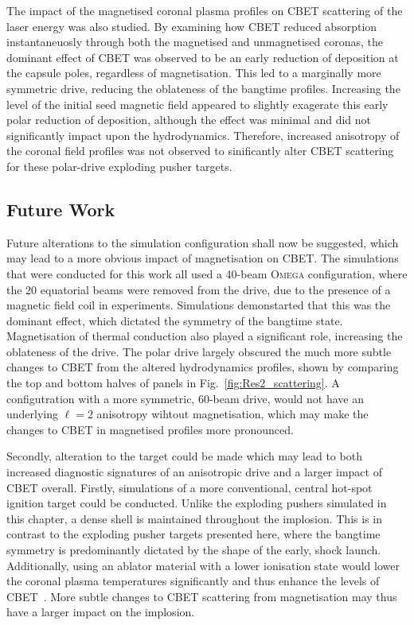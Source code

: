 The impact of the magnetised coronal plasma profiles on \ac{CBET} scattering of the laser energy was also studied.
By examining how \ac{CBET} reduced absorption instantaneuosly through both the magnetised and unmagnetised coronas, the dominant effect of \ac{CBET} was observed to be an early reduction of deposition at the capsule poles, regardless of magnetisation.
This led to a marginally more symmetric drive, reducing the oblateness of the bangtime profiles.
Increasing the level of the initial seed magnetic field appeared to slightly exagerate this early polar reduction of deposition, although the effect was minimal and did not significantly impact upon the hydrodynamics.
Therefore, increased anisotropy of the coronal field profiles was not observed to sinificantly alter \ac{CBET} scattering for these polar-drive exploding pusher targets.

\subsection{Future Work}%
\label{sec:Res2_future}

Future alterations to the simulation configuration shall now be suggested, which may lead to a more obvious impact of magnetisation on \ac{CBET}.
The simulations that were conducted for this work all used a 40-beam \textsc{Omega} configuration, where the 20 equatorial beams were removed from the drive, due to the presence of a magnetic field coil in experiments.
Simulations demonstarted that this was the dominant effect, which dictated the symmetry of the bangtime state.
Magnetisation of thermal conduction also played a significant role, increasing the oblateness of the drive.
The polar drive largely obscured the much more subtle changes to \ac{CBET} from the altered hydrodynamics profiles, shown by comparing the top and bottom halves of panels in Fig.~\ref{fig:Res2_scattering}.
A configutration with a more symmetric, 60-beam drive, would not have an underlying $\ell=2$ anisotropy wihtout magnetisation, which may make the changes to \ac{CBET} in magnetised profiles more pronounced.

Secondly, alteration to the target could be made which may lead to both increased diagnostic signatures of an anisotropic drive and a larger impact of \ac{CBET} overall.
Firstly, simulations of a more conventional, central hot-spot ignition target could be conducted.
Unlike the exploding pushers simulated in this chapter, a dense shell is maintained throughout the implosion.
This is in contrast to the exploding pusher targets presented here, where the bangtime symmetry is predominantly dictated by the shape of the early, shock launch.
Additionally, using an ablator material with a lower ionisation state would lower the coronal plasma temperatures significantly and thus enhance the levels of \ac{CBET}~\cite{colaitis_exploration_2023}.
More subtle changes to \ac{CBET} scattering from magnetisation may thus have a larger impact on the implosion.
